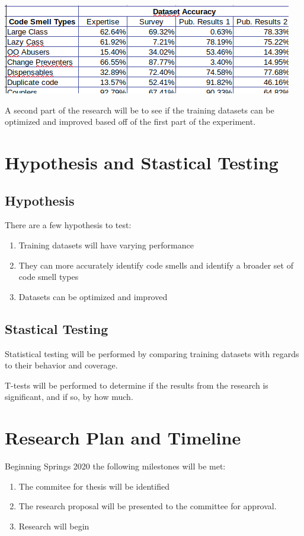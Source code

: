 \documentclass[conference]{IEEEtran}
\begin{document}
\begin{center}
\includegraphics[width=\columnwidth]{performance.png}
\label{fig:acc}%
\end{center}

A second part of the research will be to see if the training datasets can be optimized and improved based off of the first part of the experiment.

\section{Hypothesis and Stastical Testing}
\subsection{Hypothesis}
There are a few hypothesis to test:
\begin{enumerate}

\item Training datasets will have varying performance
\item They can more accurately identify code smells and identify a broader set of code smell types
\item Datasets can be optimized and improved

\end{enumerate}
\subsection{Stastical Testing}
Statistical testing will be performed by comparing training datasets with regards to their behavior and coverage.

T-tests will be performed to determine if the results from the research is significant, and if so, by how much. 

\section{Research Plan and Timeline}
Beginning Springs 2020 the following milestones will be met:
\begin{enumerate}
\item The commitee for thesis will be identified
\item The research proposal will be presented to the committee for approval.
\item Research will begin
\end{enumerate}





\end{document}
